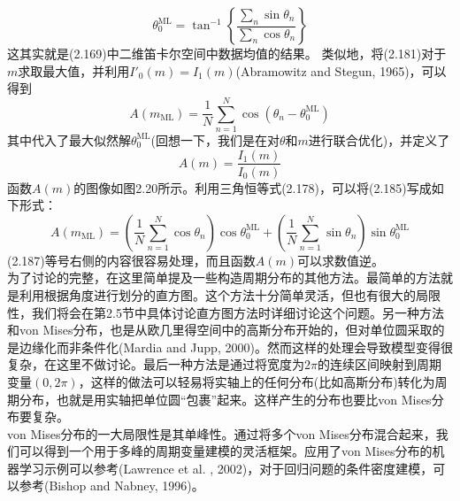 \documentclass[b5paper]{book}
\numberwithin{equation}{chapter}
\begin{document}
{	\begin{equation}
		\theta_0^{\mathrm{ML}}=\tan^{-1}\left\{\frac{\sum_n\sin\theta_n}{\sum_n\cos\theta_n}\right\}
	\end{equation}
	这其实就是(2.169)中二维笛卡尔空间中数据均值的结果。
	\indent 类似地，将(2.181)对于$m$求取最大值，并利用$I'_0(m)=I_1(m)$(Abramowitz and Stegun, 1965)，可以得到
	\begin{equation}
		A(m_{\mathrm{ML}})=\frac{1}{N}\sum_{n=1}^N\cos (\theta_n-\theta_0^{\mathrm{ML}})
	\end{equation}
	其中代入了最大似然解$\theta_0^{\mathrm{ML}}$(回想一下，我们是在对$\theta$和$m$进行联合优化)，并定义了
	\begin{equation}
		A(m)=\frac{I_1(m)}{I_0(m)}
	\end{equation}
	函数$A(m)$的图像如图2.20所示。利用三角恒等式(2.178)，可以将(2.185)写成如下形式：
	\begin{equation}
		A(m_{\mathrm{ML}})=\left(\frac{1}{N}\sum_{n=1}^N\cos \theta_n\right)\cos \theta_0^{\mathrm{ML}} + \left(\frac{1}{N}\sum_{n=1}^N\sin \theta_n\right)\sin \theta_0^{\mathrm{ML}}
	\end{equation}
	(2.187)等号右侧的内容很容易处理，而且函数$A(m)$可以求数值逆。\\
	\indent 为了讨论的完整，在这里简单提及一些构造周期分布的其他方法。最简单的方法就是利用根据角度进行划分的直方图。这个方法十分简单灵活，但也有很大的局限性，我们将会在第2.5节中具体讨论直方图方法时详细讨论这个问题。另一种方法和von Mises分布，也是从欧几里得空间中的高斯分布开始的，但对单位圆采取的是边缘化而非条件化(Mardia and Jupp, 2000)。然而这样的处理会导致模型变得很复杂，在这里不做讨论。最后一种方法是通过将宽度为$2\pi$的连续区间映射到周期变量$(0,2\pi)$，这样的做法可以轻易将实轴上的任何分布(比如高斯分布)转化为周期分布，也就是用实轴把单位圆“包裹”起来。这样产生的分布也要比von Mises分布要复杂。\\
	\indent von Mises分布的一大局限性是其单峰性。通过将多个von Mises分布混合起来，我们可以得到一个用于多峰的周期变量建模的灵活框架。应用了von Mises分布的机器学习示例可以参考(Lawrence et al. , 2002)，对于回归问题的条件密度建模，可以参考(Bishop and Nabney, 1996)。
	}
\end{document}
